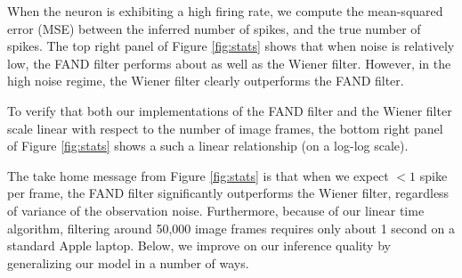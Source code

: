 When the neuron is exhibiting a high firing rate, we compute the mean-squared error (MSE) between the inferred number of spikes, and the true number of spikes.  The top right panel of Figure \ref{fig:stats} shows that when noise is relatively low, the FAND filter performs about as well as the Wiener filter.  However, in the high noise regime, the Wiener filter clearly outperforms the FAND filter.  

To verify that both our implementations of the FAND filter and the Wiener filter scale linear with respect to the number of image frames, the bottom right panel of Figure \ref{fig:stats} shows a such a linear relationship (on a log-log scale).  

The take home message from Figure \ref{fig:stats} is that when we expect $<1$ spike per frame, the FAND filter significantly outperforms the Wiener filter, regardless of variance of the observation noise.  Furthermore, because of our linear time algorithm, filtering around 50,000 image frames requires only about 1 second on a standard Apple laptop.  Below, we improve on our inference quality by generalizing our model in a number of ways.




